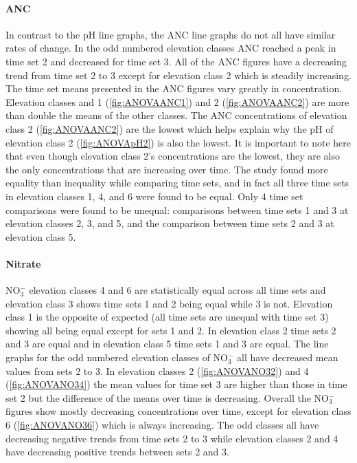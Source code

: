 \paragraph{ANC}
In contrast to the pH line graphs, the ANC line graphs do not all have similar rates of change.
In the odd numbered elevation classes ANC reached a peak in time set 2 and decreased for time set 3.
All of the ANC figures have a decreasing trend from time set 2 to 3 except for elevation class 2 which is steadily increasing. 
The time set means presented in the ANC figures vary greatly in concentration.
Elevation classes and 1 (\autoref{fig:ANOVAANC1}) and 2 (\autoref{fig:ANOVAANC2}) are more than double the means of the other classes.
The ANC concentrations of elevation class 2 (\autoref{fig:ANOVAANC2}) are the lowest which helps explain why the pH of elevation class 2 (\autoref{fig:ANOVApH2}) is also the lowest.
It is important to note here that even though elevation class 2's concentrations are the lowest, they are also the only concentrations that are increasing over time.
The study found more equality than inequality while comparing time sets, and in fact all three time sets in elevation classes 1, 4, and 6 were found to be equal.  
Only 4 time set comparisons were found to be unequal: comparisons between time sets 1 and 3 at elevation classes 2, 3, and 5, and the comparison between time sets 2 and 3 at elevation class 5.

\paragraph{Nitrate}

NO$_3^-$ elevation classes 4 and 6 are statistically equal across all time sets and elevation class 3 shows time sets 1 and 2 being equal while 3 is not.  
Elevation class 1 is the opposite of expected (all time sets are unequal with time set 3) showing all being equal except for sets 1 and 2.
In elevation class 2 time sets 2 and 3 are equal and in elevation class 5 time sets 1 and 3 are equal.
The line graphs for the odd numbered elevation classes of NO$_3^-$ all have decreased mean values from sets 2 to 3.
In elevation classes 2 (\autoref{fig:ANOVANO32}) and 4 (\autoref{fig:ANOVANO34}) the mean values for time set 3 are higher than those in time set 2 but the difference of the means over time is decreasing.
Overall the NO$_3^-$ figures show mostly decreasing concentrations over time, except for elevation class 6 (\autoref{fig:ANOVANO36}) which is always increasing.
The odd classes all have decreasing negative trends from time sets 2 to 3 while elevation classes 2 and 4 have decreasing positive trends between sets 2 and 3.

